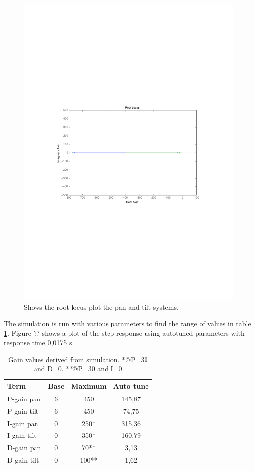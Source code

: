 \begin{figure}[htb]
	\centering
	\includegraphics[width=\textwidth,clip,trim=80 270 80 270]{graphics/rlocus_plot.pdf} %
	\caption{Shows the root locus plot the pan and tilt systems.}
	\label{fig:rlocus_plot}			
\end{figure}

The simulation is run with various parameters to find the range of values in table \ref{tab:gain_values}. Figure ?? shows a plot of the step response using autotuned parameters with response time 0,0175 s.

\begin{table}[htb]				
	\centering
	\begin{tabular}{lccc}			
	Term & Base & Maximum & Auto tune \\			
	\midrule												
P-gain pan& 6 & 450 & 145,87\\
P-gain tilt& 6 & 450 & 74,75 \\
I-gain pan& 0 & 250* & 315,36  \\
I-gain tilt& 0 & 350* & 160,79 \\
D-gain pan& 0 & 70** & 3,13 \\
D-gain tilt& 0 & 100** & 1,62\\
	\end{tabular}
	\caption{Gain values derived from simulation. *@P=30 and D=0. **@P=30 and I=0}				
	\label{tab:gain_values}			
\end{table}

